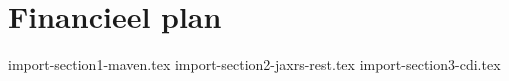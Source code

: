 \chapter{Financieel plan}
\label{Maven}
\thispagestyle{chapternohead}

	
\pagestyle{ruledfilip}
{import-section1-maven.tex}
{import-section2-jaxrs-rest.tex}
{import-section3-cdi.tex}





